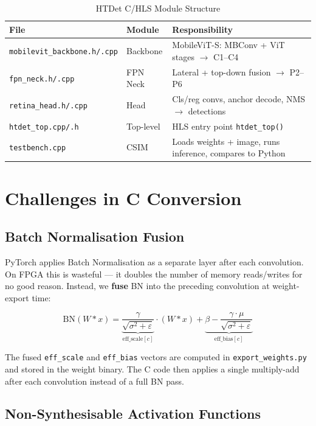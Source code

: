 \begin{table}[H]
\centering
\caption{HTDet C/HLS Module Structure}
\begin{tabular}{|l|l|l|}
\hline
\textbf{File} & \textbf{Module} & \textbf{Responsibility} \\
\hline
\texttt{mobilevit\_backbone.h/.cpp} & Backbone & MobileViT-S: MBConv + ViT stages $\rightarrow$ C1--C4 \\
\texttt{fpn\_neck.h/.cpp}           & FPN Neck  & Lateral + top-down fusion $\rightarrow$ P2--P6 \\
\texttt{retina\_head.h/.cpp}        & Head      & Cls/reg convs, anchor decode, NMS $\rightarrow$ detections \\
\texttt{htdet\_top.cpp/.h}          & Top-level & HLS entry point \texttt{htdet\_top()} \\
\texttt{testbench.cpp}              & CSIM      & Loads weights + image, runs inference, compares to Python \\
\hline
\end{tabular}
\label{table:hls_modules}
\end{table}

\section{Challenges in C Conversion}

\subsection{Batch Normalisation Fusion}

PyTorch applies Batch Normalisation as a separate layer after each convolution. On FPGA this is wasteful — it doubles the number of memory reads/writes for no good reason. Instead, we \textbf{fuse} BN into the preceding convolution at weight-export time:

\[
\text{BN}(W * x) = \underbrace{\frac{\gamma}{\sqrt{\sigma^2+\varepsilon}}}_{\text{eff\_scale}[c]} \cdot (W * x) + \underbrace{\beta - \frac{\gamma \cdot \mu}{\sqrt{\sigma^2+\varepsilon}}}_{\text{eff\_bias}[c]}
\]

The fused \texttt{eff\_scale} and \texttt{eff\_bias} vectors are computed in \texttt{export\_weights.py} and stored in the weight binary. The C code then applies a single multiply-add after each convolution instead of a full BN pass.

\subsection{Non-Synthesisable Activation Functions}

